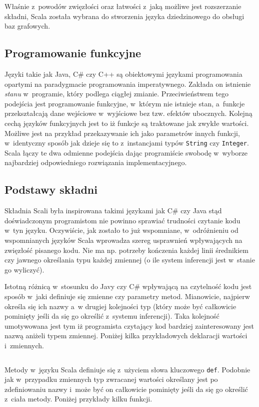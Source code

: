 \documentclass[brudnopis]{xmgr}
\begin{document}
Właśnie z~powodów zwięzłości oraz łatwości z~jaką możliwe jest rozszerzanie składni, Scala została wybrana do stworzenia języka dziedzinowego do obsługi baz grafowych.

\subsection{Programowanie funkcyjne}

Języki takie jak Java, C\# czy C++ są obiektowymi językami programowania opartymi na paradygmacie programowania imperatywnego. Zakłada on istnienie \textit{stanu} w~programie, który podlega ciągłej zmianie. Przeciwieństwem tego podejścia jest programowanie funkcyjne, w~którym nie istnieje stan, a~funkcje przekształcają dane wejściowe w~wyjściowe bez tzw. efektów ubocznych. Kolejną cechą języków funkcyjnych jest to iż funkcje są traktowane jak zwykłe wartości. Możliwe jest na przykład przekazywanie ich jako parametrów innych funkcji, w~identyczny sposób jak dzieje się to z~instancjami typów \texttt{String} czy \texttt{Integer}. Scala łączy te dwa odmienne podejścia dając programiście swobodę w~wyborze najbardziej odpowiedniego rozwiązania implementacyjnego.

\subsection{Podstawy składni}
Składnia Scali była inspirowana takimi językami jak C\# czy Java stąd doświadczonym programistom nie powinno sprawiać trudności czytanie kodu w~tyn języku. Oczywiście, jak zostało to już wspomniane, w~odróżnieniu od wspomnianych języków Scala wprowadza szereg usprawnień wpływających na zwięzłość pisanego kodu. Nie ma np. potrzeby kończenia każdej linii średnikiem czy jawnego określania typu każdej zmiennej (o ile system inferencji jest w~stanie go wyliczyć).

Istotną różnicą w~stosunku do Javy czy C\# wpływającą na czytelność kodu jest sposób w~jaki definiuje się zmienne czy parametry metod. Mianowicie, najpierw określa się ich nazwy a~w drugiej kolejności typ (który może być całkowicie pominięty jeśli da się go określić z~systemu inferencji). Taka kolejność umotywowana jest tym iż programista czytający kod bardziej zainteresowany jest nazwą aniżeli typem zmiennej. Poniżej kilka przykładowych deklaracji wartości i~zmiennych.

\inputminted{scala}{listings/scala/val-var-declarations.scala}

Metody w~języku Scala definiuje się z~użyciem słowa kluczowego \texttt{def}. Podobnie jak w~przypadku zmiennych typ zwracanej wartości określany jest po zdefiniowaniu nazwy i~może być on całkowicie pominięty jeśli da się go określić z~ciała metody. Poniżej przykłady kilku funkcji.
\end{document}

